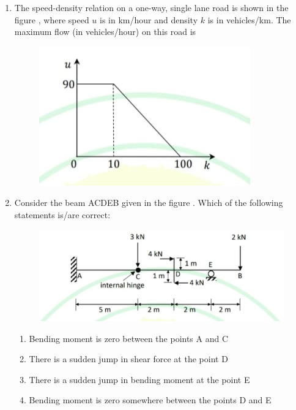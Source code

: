 \documentclass[journal,12pt,onecolumn]{article}
\theoremstyle{remark}
\begin{document}
\begin{enumerate}
\item The speed-density relation on a one-way, single lane road is shown in the figure , where speed $u$ is in km/hour and density $k$ is in vehicles/km. The maximum flow (in vehicles/hour) on this road is
\begin{figure}[H]
    \centering
    \includegraphics[width=0.7\columnwidth]{figs/1q-40.jpg}
    \caption{}
    \label{fig:q40}
\end{figure}

\hfill{}
\begin{enumerate}
\end{enumerate}

\item Consider the beam ACDEB given in the figure . Which of the following statements is/are correct:
\begin{figure}[H]
    \centering
    \includegraphics[width=0.7\columnwidth]{figs/1q-41.jpg}
    \caption{}
    \label{fig:q41}
\end{figure}

\hfill{}
\begin{enumerate}
    \item Bending moment is zero between the points A and C
    \item There is a sudden jump in shear force at the point D
    \item There is a sudden jump in bending moment at the point E
    \item Bending moment is zero somewhere between the points D and E
\end{enumerate}


\end{enumerate}
\end{document}
